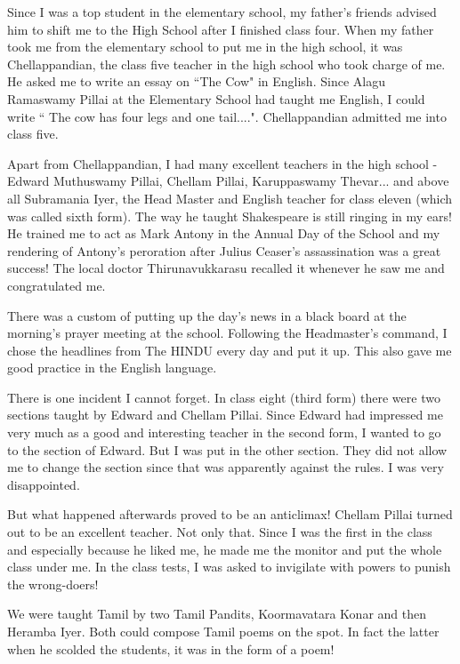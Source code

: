 Since I was a top student in the elementary school, my father's friends 
advised him to shift me to the High School after I finished class four. 
When my father took me from the elementary school to put me in the high 
school, it was Chellappandian, the class five teacher in the high school 
who took charge of me. He asked me to write an essay on ``The Cow" in 
English. Since Alagu Ramaswamy Pillai at the Elementary School had 
taught me English, I could write `` The cow has four legs and one 
tail....". Chellappandian admitted me into class five.

Apart from Chellappandian, I had many excellent teachers in the high 
school - Edward Muthuswamy Pillai, Chellam Pillai, Karuppaswamy 
Thevar... and above all Subramania Iyer, the Head Master and English 
teacher for class eleven (which was called sixth form). The way he 
taught Shakespeare is still ringing in my ears! He trained me to act as 
Mark Antony in the Annual Day of the School and my rendering of Antony's 
peroration after Julius Ceaser's assassination was a great success! The 
local doctor Thirunavukkarasu recalled it whenever he saw me and 
congratulated me.

There was a custom of putting up the day's news in a black board at the 
morning's prayer meeting at the school. Following the Headmaster's 
command, I chose the headlines from The HINDU every day and put it up. 
This also gave me good practice in the English language.

There is one incident I cannot forget. In class eight (third form) there 
were two sections taught by Edward and Chellam Pillai. Since Edward had 
impressed me very much as a good and interesting teacher in the second 
form, I wanted to go to the section of Edward. But I was put in the 
other section. They did not allow me to change the section since that 
was apparently against the rules. I was very disappointed.

But what happened afterwards proved to be an anticlimax! Chellam Pillai 
turned out to be an excellent teacher. Not only that. Since I was the 
first in the class and especially because he liked me, he made me the 
monitor and put the whole class under me. In the class tests, I was 
asked to invigilate with powers to punish the wrong-doers!

We were taught Tamil by two Tamil Pandits, Koormavatara Konar and then 
Heramba Iyer. Both could compose Tamil poems on the spot. In fact the 
latter when he scolded the students, it was in the form of a poem!

